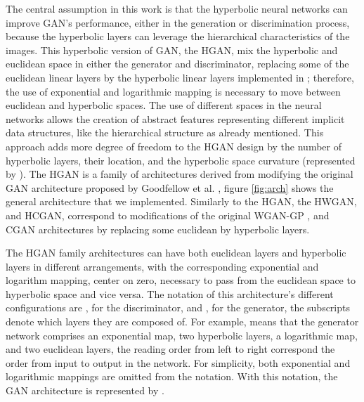 \documentclass[journal]{IEEEtran}
\begin{document}
The central assumption in this work is that the hyperbolic neural networks can improve GAN's performance, either in the generation or discrimination process, because the hyperbolic layers can leverage the hierarchical characteristics of the images\cite{hyime}. This hyperbolic version of GAN, the HGAN, mix the hyperbolic and euclidean space in either the generator and discriminator, replacing some of the euclidean linear layers by the hyperbolic linear layers implemented in \cite{hyime}; therefore, the use of exponential and logarithmic mapping is necessary to move between euclidean and hyperbolic spaces. The use of different spaces in the neural networks allows the creation of abstract features representing different implicit data structures, like the hierarchical structure as already mentioned. This approach adds more degree of freedom to the HGAN design by the number of hyperbolic layers, their location, and the hyperbolic space curvature (represented by ). The HGAN is a family of architectures derived from modifying the original GAN architecture proposed by Goodfellow et al. \cite{gan}, figure \ref{fig:arch} shows the general architecture that we implemented. Similarly to the HGAN, the HWGAN, and HCGAN, correspond to modifications of the original WGAN-GP \cite{wgan-gp}, and CGAN \cite{cgan} architectures by replacing some euclidean by hyperbolic layers.\newline

The HGAN family architectures can have both euclidean layers and hyperbolic layers in different arrangements, with the corresponding exponential and logarithm mapping, center on zero, necessary to pass from the euclidean space to hyperbolic space and vice versa. The notation of this architecture's different configurations are , for the discriminator, and , for the generator, the subscripts denote which layers they are composed of. For example,  means that the generator network comprises an exponential map, two hyperbolic layers, a logarithmic map, and two euclidean layers,  the reading order from left to right correspond the order from input to output in the network. For simplicity, both exponential and logarithmic mappings are omitted from the notation. With this notation, the GAN architecture is represented by . \newline
\end{document}
